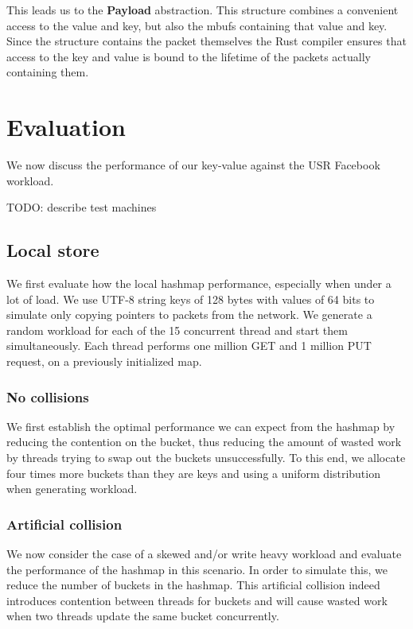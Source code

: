 \documentclass[11pt]{article}
\begin{document}
This leads us to the \textbf{Payload} abstraction. This structure combines a
convenient access to the value and key, but also the mbufs containing
that value and key. Since the structure contains the packet
themselves the Rust compiler ensures that access to the key and value
is bound to the lifetime of the packets actually containing them.

\section{Evaluation}

We now discuss the performance of our key-value against the USR
Facebook workload.

TODO: describe test machines

\subsection{Local store}

We first evaluate how the local hashmap performance, especially when
under a lot of load. We use UTF-8 string keys of 128 bytes with values
of 64 bits to simulate only copying pointers to packets from the
network. We generate a random workload for each of the 15 concurrent
thread and start them simultaneously. Each thread performs one million
GET and 1 million PUT request, on a previously initialized map.

\subsubsection{No collisions}

We first establish the optimal performance we can expect from the
hashmap by reducing the contention on the bucket, thus reducing the
amount of wasted work by threads trying to swap out the buckets
unsuccessfully. To this end, we allocate four times more buckets than
they are keys and using a uniform distribution when generating
workload.

\subsubsection{Artificial collision}

We now consider the case of a skewed and/or write heavy workload and
evaluate the performance of the hashmap in this scenario. In order to
simulate this, we reduce the number of buckets in the hashmap. This
artificial collision indeed introduces contention between threads for
buckets and will cause wasted work when two threads update the same
bucket concurrently.
\end{document}
